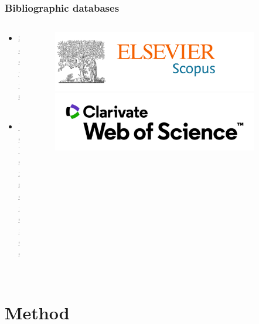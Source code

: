 \documentclass[aspectratio=169]{beamer}
\begin{document}
\begin{frame}
	\frametitle{Bibliographic databases}
	\begin{columns}
		\begin{column}{0.5\textwidth}
			\begin{itemize}
				\item \href{https://www.scopus.com}{Scopus}.
				\item \href{https://www.webofknowledge.com}{Web of science}.
			\end{itemize}
		\end{column}
		\begin{column}{0.5\textwidth}
			\begin{figure}
				\centering
				\includegraphics[width=0.9\textwidth]{logos/scopus.png}\newline
				\includegraphics[width=0.9\textwidth]{logos/wos.png}
			\end{figure}
		\end{column}
	\end{columns}
\end{frame}



\section{Method}
\end{document}
